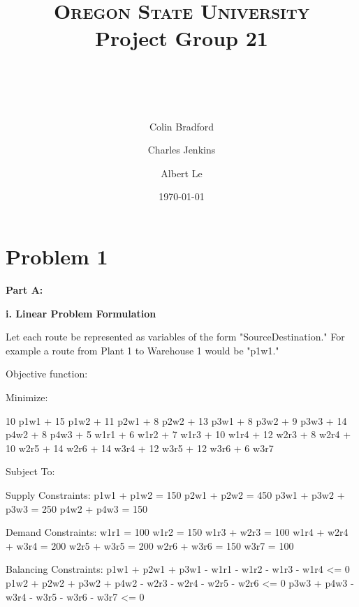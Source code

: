 \documentclass[paper=a4, fontsize=11pt]{scrartcl} %
\title{ 
    \normalfont \normalsize 
    \textsc{Oregon State University} \\ [25pt]
    \large Project Group 21
    \horrule{0.5pt} \\[0.4cm] %
    \huge \hwtitle \\ %
    \horrule{2pt} \\[0.5cm] %
}
\author{
    Colin Bradford
    \and
    Charles Jenkins
    \and
    Albert Le
} %
\date{\normalsize\today} %
\numberwithin{equation}{section} %
\numberwithin{figure}{section} %
\numberwithin{table}{section} %
\begin{document}
\maketitle %

\section{Problem 1}
\textbf{Part A:}

    \textbf{i. Linear Problem Formulation}\newline
    
    Let each route be represented as variables of the form "SourceDestination." For example a route from Plant 1 to Warehouse 1 would be "p1w1."\newline
    

    Objective function:\newline
    
    Minimize:\newline
    
    10 p1w1 + 15 p1w2 + 11 p2w1 + 8 p2w2 + 13 p3w1 + 8 p3w2 + 9 p3w3 
	  + 14 p4w2 + 8 p4w3 + 5 w1r1 + 6 w1r2 + 7 w1r3 + 10 w1r4 + 12 w2r3 
	  + 8 w2r4 + 10 w2r5 + 14 w2r6 + 14 w3r4 + 12 w3r5 + 12 w3r6 + 6 w3r7\newline
	  
	
	Subject To:\newline
		
		Supply Constraints:\newline
		   p1w1 + p1w2 = 150\newline
		   p2w1 + p2w2 = 450\newline
		   p3w1 + p3w2 + p3w3 = 250\newline
		   p4w2 + p4w3 = 150\newline
		
		Demand Constraints:\newline
		   w1r1 = 100\newline
		   w1r2 = 150\newline
		   w1r3 + w2r3 = 100\newline
		   w1r4 + w2r4 + w3r4 = 200\newline
		   w2r5 + w3r5 = 200\newline
		   w2r6 + w3r6 = 150\newline
		   w3r7 = 100\newline
		
		Balancing Constraints:\newline
		   p1w1 + p2w1 + p3w1 - w1r1 - w1r2 - w1r3 - w1r4 <= 0\newline
		   p1w2 + p2w2 + p3w2 + p4w2 - w2r3 - w2r4 - w2r5 - w2r6 <= 0\newline
		   p3w3 + p4w3 - w3r4 - w3r5 - w3r6 - w3r7 <= 0\newline
		
\end{document}
